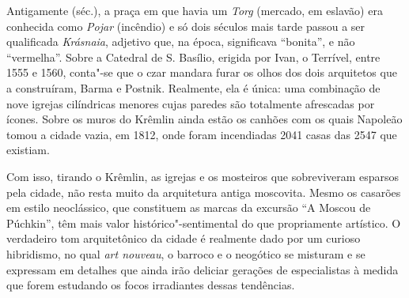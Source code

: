 Antigamente (séc.), a praça em que havia um \emph{Torg} (mercado, em eslavão) era conhecida como \emph{Pojar} (incêndio) e só dois séculos mais tarde passou a ser qualificada \emph{Krásnaia}, adjetivo que, na época, significava ``bonita'', e não ``vermelha''. Sobre a Catedral de S. Basílio, erigida por Ivan, o Terrível, entre 1555 e 1560, conta"-se que o czar mandara furar os olhos dos dois arquitetos que a construíram, Barma e Postnik. Realmente, ela é única: uma combinação de nove igrejas cilíndricas menores cujas paredes são totalmente afrescadas por ícones. Sobre os muros do Krêmlin ainda estão os canhões com os quais Napoleão tomou a cidade vazia, em 1812, onde foram incendiadas 2041 casas das 2547 que existiam.

Com isso, tirando o Krêmlin, as igrejas e os mosteiros que sobreviveram esparsos pela cidade, não resta muito da arquitetura antiga moscovita. Mesmo os casarões em estilo neoclássico, que constituem as marcas da excursão ``A Moscou de Púchkin'', têm mais valor histórico"-sentimental do que propriamente artístico. O verdadeiro tom arquitetônico da cidade é realmente dado por um curioso hibridismo, no qual \emph{art nouveau}, o barroco e o neogótico se misturam e se expressam em detalhes que ainda irão deliciar gerações de especialistas à medida que forem estudando os focos irradiantes dessas tendências.


